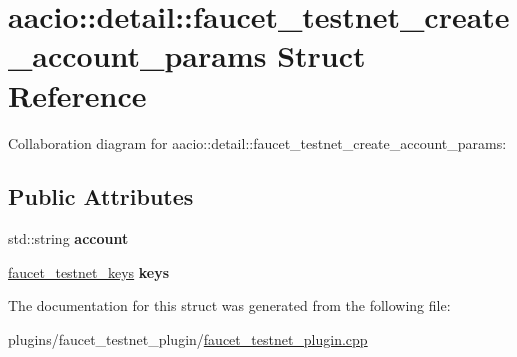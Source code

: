 \hypertarget{structaacio_1_1detail_1_1faucet__testnet__create__account__params}{}\section{aacio\+:\+:detail\+:\+:faucet\+\_\+testnet\+\_\+create\+\_\+account\+\_\+params Struct Reference}
\label{structaacio_1_1detail_1_1faucet__testnet__create__account__params}


Collaboration diagram for aacio\+:\+:detail\+:\+:faucet\+\_\+testnet\+\_\+create\+\_\+account\+\_\+params\+:
\subsection*{Public Attributes}
\begin{DoxyCompactItemize}
\item 
\mbox{\label{structaacio_1_1detail_1_1faucet__testnet__create__account__params_aabdd13776987a47dff428550c8d34966}} 
std\+::string {\bfseries account}
\item 
\mbox{\label{structaacio_1_1detail_1_1faucet__testnet__create__account__params_adc2f36442a0793b99adf0e74d2bff9b8}} 
\mbox{\hyperlink{structaacio_1_1detail_1_1faucet__testnet__keys}{faucet\+\_\+testnet\+\_\+keys}} {\bfseries keys}
\end{DoxyCompactItemize}


The documentation for this struct was generated from the following file\+:\begin{DoxyCompactItemize}
\item 
plugins/faucet\+\_\+testnet\+\_\+plugin/\mbox{\hyperlink{faucet__testnet__plugin_8cpp}{faucet\+\_\+testnet\+\_\+plugin.\+cpp}}\end{DoxyCompactItemize}
